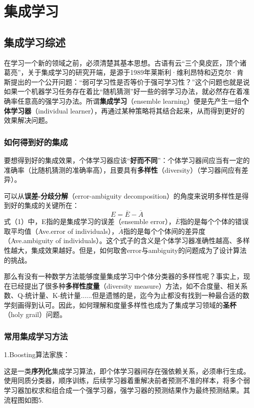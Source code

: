 \section{集成学习}

\subsection{集成学习综述}

在学习一个新的领域之前，必须清楚其基本思想。古语有云“三个臭皮匠，顶个诸葛亮”，关于集成学习的研究开端，是源于1989年莱斯利·维利昂特和迈克尔·肯斯提出的一个公开问题：“弱可学习性是否等价于强可学习性？”这个问题也就是说如果一个机器学习任务存在着比“随机猜测”好一些的弱学习办法，就必然存在着准确率任意高的强学习办法。所谓\textbf{集成学习}（ensemble learning）便是先产生一组\textbf{个体学习器}（individual learner），再通过某种策略将其结合起来，从而得到更好的效果解决问题。
\subsubsection{如何得到好的集成}
要想得到好的集成效果，个体学习器应该“\textbf{好而不同}”：个体学习器间应当有一定的准确率（比随机猜测的准确率高），且要具有\textbf{多样性}（diversity）（学习器间应有差异）。

可以从\textbf{误差-分歧分解}（error-ambiguity decomposition）的角度来说明多样性是得到好的集成的关键所在：
\setcounter{equation}{0} %
\begin{equation}E=\overline{E}-\overline{A}\end{equation}
式（1）中，E指的是集成学习的误差（ensemble error），$\overline{E}$指的是每个个体的错误取平均值（Ave.error of individuals），$\overline{A}$指的是每个个体间的差异度（Ave.ambiguity of individuals）。这个式子的含义是个体学习器准确性越高、多样性越大，集成效果越好。但是，如何取舍error与ambiguity的问题成为了设计算法的挑战。

那么有没有一种数学方法能够度量集成学习中个体分类器的多样性呢？事实上，现在已经提出了很多种\textbf{多样性度量}（diversity measure）方法，如不合度量、相关系数、Q-统计量、$\text{K}$-统计量......但是遗憾的是，迄今为止都没有找到一种最合适的数学刻画得到认可。因此，如何理解和度量多样性也成为了集成学习领域的\textbf{圣杯}（holy grail）问题。
\subsubsection{常用集成学习方法}
1.Boosting算法家族：

这是一类\textbf{序列化}集成学习算法，即个体学习器间存在强依赖关系，必须串行生成。使用同质分类器，顺序训练，后续学习器着重解决前者预测不准的样本，将多个弱学习器加权求和组合成一个强学习器，强学习器的预测结果作为最终预测结果。其流程图如图5.


